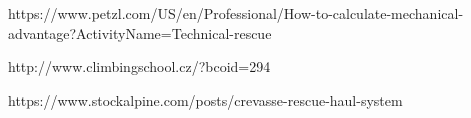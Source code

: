 https://www.petzl.com/US/en/Professional/How-to-calculate-mechanical-advantage?ActivityName=Technical-rescue

http://www.climbingschool.cz/?bcoid=294

https://www.stockalpine.com/posts/crevasse-rescue-haul-system
